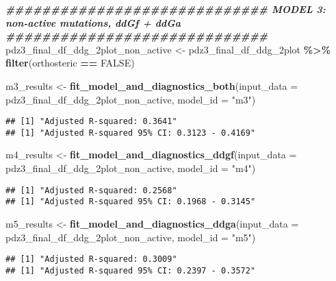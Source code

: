 \documentclass[
]{article}
\newenvironment{Shaded}{\begin{snugshade}}{\end{snugshade}}
\newcommand{\AttributeTok}[1]{\textcolor[rgb]{0.13,0.29,0.53}{#1}}
\newcommand{\ConstantTok}[1]{\textcolor[rgb]{0.56,0.35,0.01}{#1}}
\newcommand{\DocumentationTok}[1]{\textcolor[rgb]{0.56,0.35,0.01}{\textbf{\textit{#1}}}}
\newcommand{\FunctionTok}[1]{\textcolor[rgb]{0.13,0.29,0.53}{\textbf{#1}}}
\newcommand{\NormalTok}[1]{#1}
\newcommand{\OtherTok}[1]{\textcolor[rgb]{0.56,0.35,0.01}{#1}}
\newcommand{\SpecialCharTok}[1]{\textcolor[rgb]{0.81,0.36,0.00}{\textbf{#1}}}
\newcommand{\StringTok}[1]{\textcolor[rgb]{0.31,0.60,0.02}{#1}}
\begin{document}
\begin{Shaded}
\begin{Highlighting}[]
\DocumentationTok{\#\#\#\#\#\#\#\#\#\#\#\#\#\#\#\#\#\#\#\#\#\#\#\#\#\#\#\#\# MODEL 3: non{-}active mutations, ddGf + ddGa \#\#\#\#\#\#\#\#\#\#\#\#\#\#\#\#\#\#\#\#\#\#\#\#\#\#\#\#\#}
\NormalTok{pdz3\_final\_df\_ddg\_2plot\_non\_active }\OtherTok{\textless{}{-}}\NormalTok{ pdz3\_final\_df\_ddg\_2plot }\SpecialCharTok{\%\textgreater{}\%} \FunctionTok{filter}\NormalTok{(orthosteric }\SpecialCharTok{==} \ConstantTok{FALSE}\NormalTok{)}

\NormalTok{m3\_results }\OtherTok{\textless{}{-}} \FunctionTok{fit\_model\_and\_diagnostics\_both}\NormalTok{(}\AttributeTok{input\_data =}\NormalTok{ pdz3\_final\_df\_ddg\_2plot\_non\_active, }\AttributeTok{model\_id =} \StringTok{"m3"}\NormalTok{)}
\end{Highlighting}
\end{Shaded}

\begin{verbatim}
## [1] "Adjusted R-squared: 0.3641"
## [1] "Adjusted R-squared 95% CI: 0.3123 - 0.4169"
\end{verbatim}

\begin{Shaded}
\begin{Highlighting}[]
\NormalTok{m4\_results }\OtherTok{\textless{}{-}} \FunctionTok{fit\_model\_and\_diagnostics\_ddgf}\NormalTok{(}\AttributeTok{input\_data =}\NormalTok{ pdz3\_final\_df\_ddg\_2plot\_non\_active, }\AttributeTok{model\_id =} \StringTok{"m4"}\NormalTok{)}
\end{Highlighting}
\end{Shaded}

\begin{verbatim}
## [1] "Adjusted R-squared: 0.2568"
## [1] "Adjusted R-squared 95% CI: 0.1968 - 0.3145"
\end{verbatim}

\begin{Shaded}
\begin{Highlighting}[]
\NormalTok{m5\_results }\OtherTok{\textless{}{-}} \FunctionTok{fit\_model\_and\_diagnostics\_ddga}\NormalTok{(}\AttributeTok{input\_data =}\NormalTok{ pdz3\_final\_df\_ddg\_2plot\_non\_active, }\AttributeTok{model\_id =} \StringTok{"m5"}\NormalTok{)}
\end{Highlighting}
\end{Shaded}

\begin{verbatim}
## [1] "Adjusted R-squared: 0.3009"
## [1] "Adjusted R-squared 95% CI: 0.2397 - 0.3572"
\end{verbatim}
\end{document}
